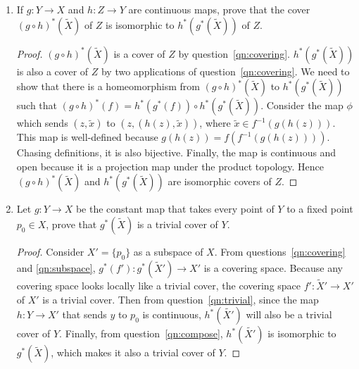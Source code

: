 \documentclass{article}
\begin{document}
\begin{enumerate}
\begin{enumerate}
\begin{proof}
          $\phi$ is bijective from the way it was defined. Also, it is a
          projection map under the product topology, which makes it open
          and continuous. Therefore $\phi$ is a homeomorphism, which
          completes the proof.
        \end{proof}

      \item If $g:Y\rightarrow X$ and $h:Z\rightarrow Y$ are continuous
        maps, prove that the cover $(g\circ h)^*(\tilde{X})$ of $Z$ is
        isomorphic to $h^*(g^*(\tilde{X}))$ of $Z$. \label{qn:compose}

        \begin{proof}
          $(g\circ h)^*(\tilde{X})$ is a cover of $Z$ by
          question~\ref{qn:covering}. $h^*(g^*(\tilde{X}))$ is also a cover
          of $Z$ by two applications of question~\ref{qn:covering}.  We
          need to show that there is a homeomorphism from $(g\circ
          h)^*(\tilde{X})$ to $h^*(g^*(\tilde{X}))$ such that $(g\circ
          h)^*(f)=h^*(g^*(f))\circ h^*(g^*(\tilde{X}))$. Consider the map
          $\phi$ which sends $(z,\tilde{x})$ to $(z,(h(z),\tilde{x}))$,
          where $\tilde{x}\in f^{-1}(g(h(z)))$. This map is well-defined
          because $g(h(z))=f(f^{-1}(g(h(z))))$. Chasing definitions, it is
          also bijective. Finally, the map is continuous and open because
          it is a projection map under the product topology. Hence $(g\circ
          h)^*(\tilde{X})$ and $h^*(g^*(\tilde{X}))$ are isomorphic covers
          of $Z$.
        \end{proof}

      \item Let $g:Y\rightarrow X$ be the constant map that takes every
        point of $Y$ to a fixed point $p_0\in X$, prove that
        $g^*(\tilde{X})$ is a trivial cover of $Y$. 

        \begin{proof}
          Consider $X'=\{p_0\}$ as a subspace of $X$.  From
          questions~\ref{qn:covering} and \ref{qn:subspace},
          $g^*(f'):g^*(\tilde{X}')\rightarrow X'$ is a covering space.
          Because any covering space looks locally like a trivial cover,
          the covering space $f':\tilde{X}'\rightarrow X'$ of $X'$ is a
          trivial cover. Then from question~\ref{qn:trivial}, since the map
          $h:Y\rightarrow X'$ that sends $y$ to $p_0$ is continuous,
          $h^*(\tilde{X'})$ will also be a trivial cover of $Y$. Finally,
          from question~\ref{qn:compose}, $h^*(\tilde{X'})$ is isomorphic
          to $g^*(\tilde{X})$, which makes it also a trivial cover of $Y$.
        \end{proof}
    \end{enumerate}


\end{enumerate}
\end{document}
